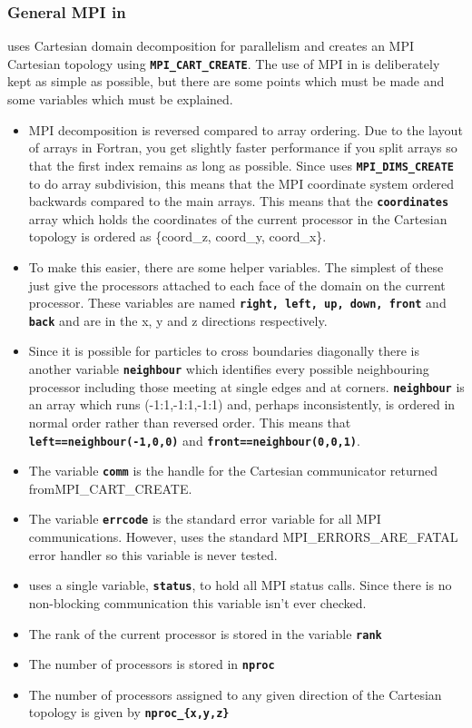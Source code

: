 \documentclass[12pt,a4paper]{article}
\newcommand{\inlinecode}[1]{{\color{warwickred} \bf\texttt{#1}}}
\newcommand{\EPOCH}{{\color{warwickdark}\fontfamily{phv}\selectfont{EPOCH}}}
\begin{document}
\subsubsection{General MPI in {\EPOCH}}
{\EPOCH} uses Cartesian domain decomposition for parallelism and creates an MPI
Cartesian topology using \inlinecode{MPI\_CART\_CREATE}.  The use of MPI in
{\EPOCH} is deliberately kept as simple as possible, but there are some points
which must be made and some variables which must be explained.
\begin{itemize}
\item MPI decomposition is reversed compared to array ordering. Due to the
  layout of arrays in Fortran, you get slightly faster performance if you split
  arrays so that the first index remains as long as possible. Since {\EPOCH} uses
  \inlinecode{MPI\_DIMS\_CREATE} to do array subdivision, this means that the
  MPI coordinate system ordered backwards compared to the main arrays. This
  means that the \inlinecode{coordinates} array which holds the coordinates of
  the current processor in the Cartesian topology is ordered as \{coord\_z,
  coord\_y, coord\_x\}.
\item To make this easier, there are some helper variables. The simplest of
  these just give the processors attached to each face of the domain on the
  current processor. These variables are named \inlinecode{right, left, up,
    down, front} and \inlinecode{back} and are in the x, y and z directions
  respectively.
\item Since it is possible for particles to cross boundaries diagonally there
  is another variable \inlinecode{neighbour} which identifies every possible
  neighbouring processor including those meeting at single edges and at
  corners. \inlinecode{neighbour} is an array which runs (-1:1,-1:1,-1:1) and,
  perhaps inconsistently, is ordered in normal order rather than reversed
  order. This means that \inlinecode{left==neighbour(-1,0,0)} and
  \inlinecode{front==neighbour(0,0,1)}.
\item The variable \inlinecode{comm} is the handle for the Cartesian
  communicator returned from\linebreak MPI\_CART\_CREATE.
\item The variable \inlinecode{errcode} is the standard error variable for all
  MPI communications. However, {\EPOCH} uses the standard MPI\_ERRORS\_ARE\_FATAL
  error handler so this variable is never tested.
\item {\EPOCH} uses a single variable, \inlinecode{status}, to hold all MPI
  status calls. Since there is no non-blocking communication this variable
  isn't ever checked.
\item The rank of the current processor is stored in the variable
  \inlinecode{rank}
\item The number of processors is stored in \inlinecode{nproc}
\item The number of processors assigned to any given direction of the Cartesian
  topology is given by \inlinecode{nproc\_\{x,y,z\}}
\end{itemize}
\end{document}
